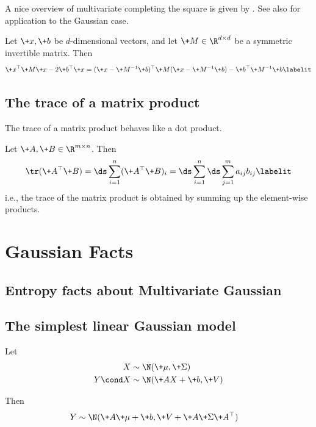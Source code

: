 \documentclass{article} %
\begin{document}
A nice overview of multivariate completing the square is given by \cite{gundersen2019completing}.   See also \cite[pp.~86]{bishop2006pattern} for application to the Gaussian case.

Let $\+x,  \+b$ be $d$-dimensional vectors, and let $\+M \in \R^{d \times d}$ be a symmetric invertible matrix. Then
%
\begin{align*}
\+x^\top \+M \+x - 2 \+b^\top \+x = (\+x - \+M^{-1} \+b)^\top \+M (\+x - \+M^{-1} \+b) - \+b^\top \+M^{-1} \+b
 \labelit \label{eqn:multivariate_completing_the_square}
\end{align*}

% 

\subsection{The trace of a matrix product}

The trace of a matrix product behaves like a dot product.  

Let $\+A, \+B \in \R^{m \times n}$.  Then 
%
\begin{align*}
\tr (\+A^\top \+B) = \ds\sum_{i=1}^n (\+A^\top \+B)_i = \ds\sum_{i=1}^n \ds\sum_{j=1}^m a_{ij} b_{ij}
\labelit \label{eqn:trace_of_matrix_product}
\end{align*}
%
i.e.,  the trace of the matrix product is obtained by summing up the element-wise products. 


\section{Gaussian Facts}

\subsection{Entropy facts about Multivariate Gaussian}



\subsection{The simplest linear Gaussian model}

\begin{proposition}
\label{prop:simplest_linear_gaussian_model}
Let
\begin{align*}
X &\sim \N(\+\mu,  \+\Sigma) \\
Y \cond X &\sim \N(\+AX+\+b,  \+V) \\
\end{align*}

Then
\begin{align*}
Y &\sim \N(\+A \+\mu + \+b,  \+V + \+A \+\Sigma \+A^\top)
\end{align*}
\end{proposition}
\end{document}
